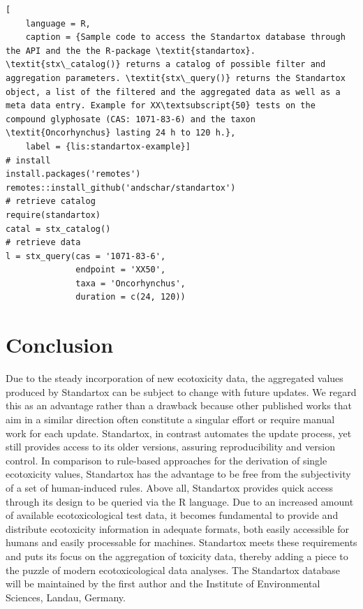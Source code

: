 \documentclass[journal,datadescriptor,submit,moreauthors,pdftex]{Definitions/mdpi}
\begin{document}
\begin{lstlisting}[
    language = R,
    caption = {Sample code to access the Standartox database through the API and the the R-package \textit{standartox}. \textit{stx\_catalog()} returns a catalog of possible filter and aggregation parameters. \textit{stx\_query()} returns the Standartox object, a list of the filtered and the aggregated data as well as a meta data entry. Example for XX\textsubscript{50} tests on the compound glyphosate (CAS: 1071-83-6) and the taxon \textit{Oncorhynchus} lasting 24 h to 120 h.},
    label = {lis:standartox-example}]
# install
install.packages('remotes')
remotes::install_github('andschar/standartox')
# retrieve catalog    
require(standartox)
catal = stx_catalog()
# retrieve data
l = stx_query(cas = '1071-83-6',
              endpoint = 'XX50',
              taxa = 'Oncorhynchus',
              duration = c(24, 120))
\end{lstlisting}

\section{Conclusion}
Due to the steady incorporation of new ecotoxicity data, the aggregated values produced by Standartox can be subject to change with future updates. We regard this as an advantage rather than a drawback because other published works that aim in a similar direction often constitute a singular effort or require manual work for each update. Standartox, in contrast automates the update process, yet still provides access to its older versions, assuring reproducibility and version control. In comparison to rule-based approaches for the derivation of single ecotoxicity values, Standartox has the advantage to be free from the subjectivity of a set of human-induced rules. Above all, Standartox provides quick access through its design to be queried via the R language. Due to an increased amount of available ecotoxicological test data, it becomes fundamental to provide and distribute ecotoxicity information in adequate formats, both easily accessible for humans and easily processable for machines. Standartox meets these requirements and puts its focus on the aggregation of toxicity data, thereby adding a piece to the puzzle of modern ecotoxicological data analyses. The Standartox database will be maintained by the first author and the Institute of Environmental Sciences, Landau, Germany.
\end{document}
